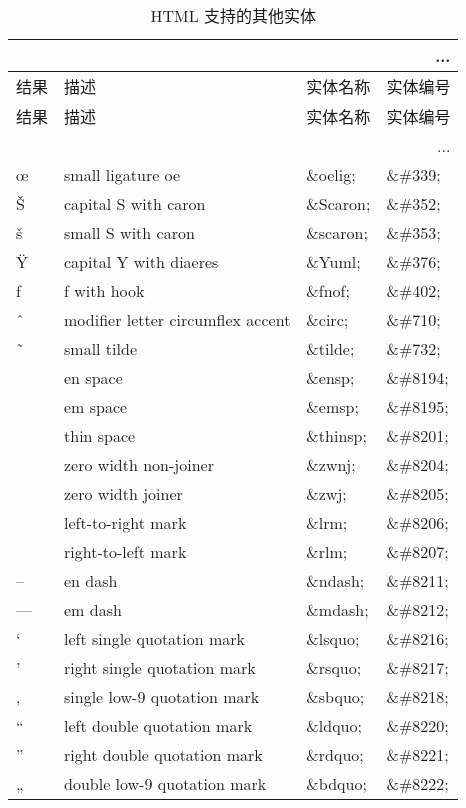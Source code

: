 \begin{longtable}{|l|l|l|l|}
\multicolumn{4}{r}{...}
\tabularnewline\hline
结果		&描述	&实体名称	&实体编号
\endhead
\caption{HTML 支持的其他实体}\\
\hline
结果		&描述	&实体名称	&实体编号
\tabularnewline\hline
\endfirsthead

\multicolumn{4}{r}{...}
\endfoot

\endlastfoot
\hline
Œ	&capital ligature OE				&\&OElig;	&\&\#338;\\
\hline
œ	&small ligature oe					&\&oelig;		&\&\#339;\\
\hline
Š	&capital S with caron				&\&Scaron;	&\&\#352;\\
\hline
š	&small S with caron				&\&scaron;	&\&\#353;\\
\hline
Ÿ	&capital Y with diaeres				&\&Yuml;		&\&\#376;\\
\hline
ƒ	&f with hook						&\&fnof;		&\&\#402;\\
\hline
ˆ	&modifier letter circumflex accent		&\&circ;		&\&\#710;\\
\hline
˜	&small tilde						&\&tilde;		&\&\#732;\\
\hline
 	&en space						&\&ensp;		&\&\#8194;\\
\hline
 	&em space						&\&emsp;	&\&\#8195;\\
\hline
 	&thin space						&\&thinsp;	&\&\#8201;\\
\hline
‌	&zero width non-joiner				&\&zwnj;		&\&\#8204;\\
\hline
‍	&zero width joiner					&\&zwj;		&\&\#8205;\\
\hline
‎	&left-to-right mark					&\&lrm;		&\&\#8206;\\
\hline
	&right-to-left mark					&\&rlm;		&\&\#8207;\\
\hline
–	&en dash							&\&ndash;	&\&\#8211;\\
\hline
—	&em dash						&\&mdash;	&\&\#8212;\\
\hline
‘	&left single quotation mark			&\&lsquo;	&\&\#8216;\\
\hline
’	&right single quotation mark			&\&rsquo;	&\&\#8217;\\
\hline
‚	&single low-9 quotation mark		&\&sbquo;	&\&\#8218;\\
\hline
“	&left double quotation mark			&\&ldquo;	&\&\#8220;\\
\hline
”	&right double quotation mark		&\&rdquo;	&\&\#8221;\\
\hline
„	&double low-9 quotation mark		&\&bdquo;	&\&\#8222;\\

\end{longtable}
